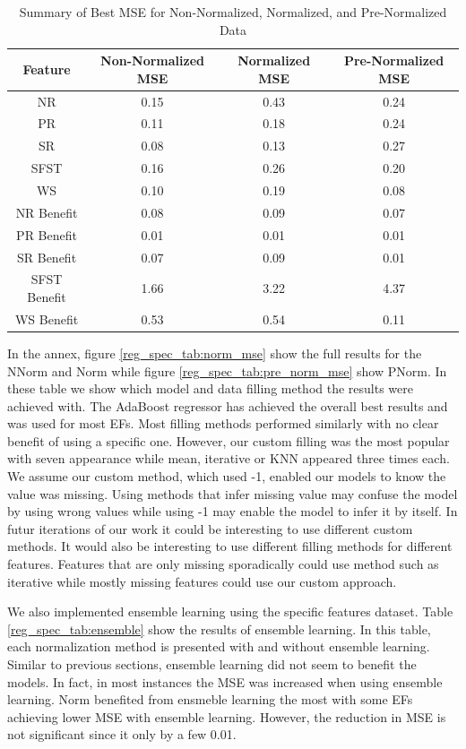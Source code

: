 \documentclass[12pt,letterpaper]{article}
\begin{document}
\begin{table}[H]
\centering
\begin{tabular}{|c|c|c|c|}
\hline
\textbf{Feature} & \textbf{Non-Normalized MSE} & \textbf{Normalized MSE} & \textbf{Pre-Normalized MSE} \\
\hline
NR & 0.15 & 0.43 & 0.24 \\
\hline
PR & 0.11 & 0.18 & 0.24 \\
\hline
SR & 0.08 & 0.13 & 0.27 \\
\hline
SFST & 0.16 & 0.26 & 0.20 \\
\hline
WS & 0.10 & 0.19 & 0.08 \\
\hline
NR Benefit & 0.08 & 0.09 & 0.07 \\
\hline
PR Benefit & 0.01 & 0.01 & 0.01 \\
\hline
SR Benefit & 0.07 & 0.09 & 0.01 \\
\hline
SFST Benefit & 1.66 & 3.22 & 4.37 \\
\hline
WS Benefit & 0.53 & 0.54 & 0.11 \\
\hline
\end{tabular}
\caption{Summary of Best MSE for Non-Normalized, Normalized, and Pre-Normalized Data}
\label{reg_spec_tab:mse_summary}
\end{table}


In the annex, figure \ref{reg_spec_tab:norm_mse} show the full results for the NNorm and Norm while  figure \ref{reg_spec_tab:pre_norm_mse} show PNorm.
In these table we show which model and data filling method the results were achieved with.
The AdaBoost regressor has achieved the overall best results and was used for most \ac{EF}s.
Most filling methods performed similarly with no clear benefit of using a specific one.
However, our custom filling was the most popular with seven appearance while mean, iterative or KNN appeared three times each.
We assume our custom method, which used -1, enabled our models to know the value was missing.
Using methods that infer missing value may confuse the model by using wrong values while using -1 may enable the model to infer it by itself.
In futur iterations of our work it could be interesting to use different custom methods.
It would also be interesting to use different filling methods for different features.
Features that are only missing sporadically could use method such as iterative while mostly missing features could use our custom approach.

We also implemented ensemble learning using the specific features dataset.
Table \ref{reg_spec_tab:ensemble} show the results of ensemble learning.
In this table, each normalization method is presented with and without ensemble learning.
Similar to previous sections, ensemble learning did not seem to benefit the models.
In fact, in most instances the MSE was increased when using ensemble learning.
Norm benefited from ensmeble learning the most with some \ac{EF}s achieving lower MSE with ensemble learning.
However, the reduction in MSE is not significant since it only by a few 0.01.
\end{document}
